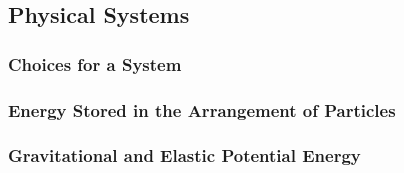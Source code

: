 \documentclass[]{exam}
\begin{document}
\subsection{Physical Systems}

\subsubsection{Choices for a System}
\subsubsection{Energy Stored in the Arrangement of Particles}
\clearpage

\subsubsection{Gravitational and Elastic Potential Energy}
\end{document}
